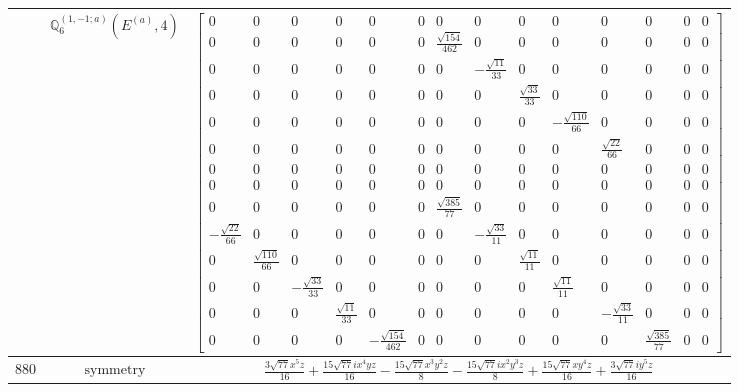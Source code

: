 \documentclass[fleqn,8pt,landscape]{jsarticle}
\begin{document}
\begin{longtable}{ccc}
$  $ & $ \mathbb{Q}_{6}^{(1,-1;a)}(E^{(a)},4) $ & $ \begin{bmatrix} 0 & 0 & 0 & 0 & 0 & 0 & 0 & 0 & 0 & 0 & 0 & 0 & 0 & 0 \\ 0 & 0 & 0 & 0 & 0 & 0 & \frac{\sqrt{154}}{462} & 0 & 0 & 0 & 0 & 0 & 0 & 0 \\ 0 & 0 & 0 & 0 & 0 & 0 & 0 & - \frac{\sqrt{11}}{33} & 0 & 0 & 0 & 0 & 0 & 0 \\ 0 & 0 & 0 & 0 & 0 & 0 & 0 & 0 & \frac{\sqrt{33}}{33} & 0 & 0 & 0 & 0 & 0 \\ 0 & 0 & 0 & 0 & 0 & 0 & 0 & 0 & 0 & - \frac{\sqrt{110}}{66} & 0 & 0 & 0 & 0 \\ 0 & 0 & 0 & 0 & 0 & 0 & 0 & 0 & 0 & 0 & \frac{\sqrt{22}}{66} & 0 & 0 & 0 \\ 0 & 0 & 0 & 0 & 0 & 0 & 0 & 0 & 0 & 0 & 0 & 0 & 0 & 0 \\ 0 & 0 & 0 & 0 & 0 & 0 & 0 & 0 & 0 & 0 & 0 & 0 & 0 & 0 \\ 0 & 0 & 0 & 0 & 0 & 0 & \frac{\sqrt{385}}{77} & 0 & 0 & 0 & 0 & 0 & 0 & 0 \\ - \frac{\sqrt{22}}{66} & 0 & 0 & 0 & 0 & 0 & 0 & - \frac{\sqrt{33}}{11} & 0 & 0 & 0 & 0 & 0 & 0 \\ 0 & \frac{\sqrt{110}}{66} & 0 & 0 & 0 & 0 & 0 & 0 & \frac{\sqrt{11}}{11} & 0 & 0 & 0 & 0 & 0 \\ 0 & 0 & - \frac{\sqrt{33}}{33} & 0 & 0 & 0 & 0 & 0 & 0 & \frac{\sqrt{11}}{11} & 0 & 0 & 0 & 0 \\ 0 & 0 & 0 & \frac{\sqrt{11}}{33} & 0 & 0 & 0 & 0 & 0 & 0 & - \frac{\sqrt{33}}{11} & 0 & 0 & 0 \\ 0 & 0 & 0 & 0 & - \frac{\sqrt{154}}{462} & 0 & 0 & 0 & 0 & 0 & 0 & \frac{\sqrt{385}}{77} & 0 & 0 \end{bmatrix} $ \\ \hline
$ 880 $ & $ \text{symmetry} $ & $ \frac{3 \sqrt{77} x^{5} z}{16} + \frac{15 \sqrt{77} i x^{4} y z}{16} - \frac{15 \sqrt{77} x^{3} y^{2} z}{8} - \frac{15 \sqrt{77} i x^{2} y^{3} z}{8} + \frac{15 \sqrt{77} x y^{4} z}{16} + \frac{3 \sqrt{77} i y^{5} z}{16} $ \\

\end{longtable}
\end{document}

